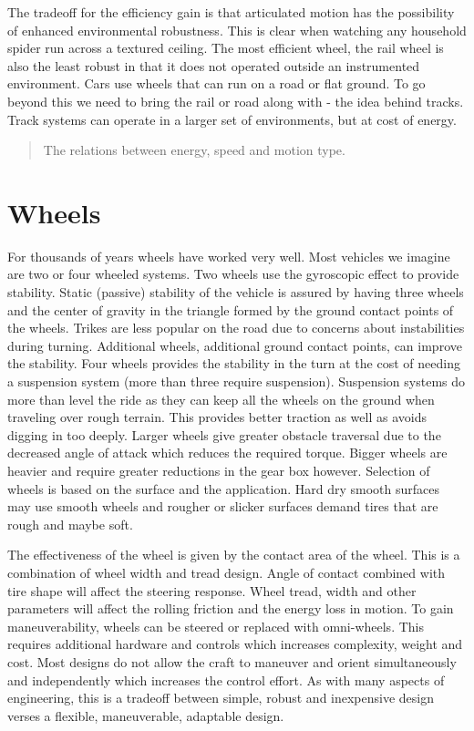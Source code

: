 The tradeoff for the efficiency gain is that articulated motion has the
possibility of enhanced environmental robustness. This is clear when
watching any household spider run across a textured ceiling. The most
efficient wheel, the rail wheel is also the least robust in that it does
not operated outside an instrumented environment. Cars use wheels that
can run on a road or flat ground. To go beyond this we need to bring the
rail or road along with - the idea behind tracks. Track systems can
operate in a larger set of environments, but at cost of energy.

\begin{quote}
The relations between energy, speed and motion type.
\end{quote}

\hypertarget{wheels}{%
\section{Wheels}\label{wheels}}

For thousands of years wheels have worked very well. Most vehicles we
imagine are two or four wheeled systems. Two wheels use the gyroscopic
effect to provide stability. Static (passive) stability of the vehicle
is assured by having three wheels and the center of gravity in the
triangle formed by the ground contact points of the wheels. Trikes are
less popular on the road due to concerns about instabilities during
turning. Additional wheels, additional ground contact points, can
improve the stability. Four wheels provides the stability in the turn at
the cost of needing a suspension system (more than three require
suspension). Suspension systems do more than level the ride as they can
keep all the wheels on the ground when traveling over rough terrain.
This provides better traction as well as avoids digging in too deeply.
Larger wheels give greater obstacle traversal due to the decreased angle
of attack which reduces the required torque. Bigger wheels are heavier
and require greater reductions in the gear box however. Selection of
wheels is based on the surface and the application. Hard dry smooth
surfaces may use smooth wheels and rougher or slicker surfaces demand
tires that are rough and maybe soft.

The effectiveness of the wheel is given by the contact area of the
wheel. This is a combination of wheel width and tread design. Angle of
contact combined with tire shape will affect the steering response.
Wheel tread, width and other parameters will affect the rolling friction
and the energy loss in motion. To gain maneuverability, wheels can be
steered or replaced with omni-wheels. This requires additional hardware
and controls which increases complexity, weight and cost. Most designs
do not allow the craft to maneuver and orient simultaneously and
independently which increases the control effort. As with many aspects
of engineering, this is a tradeoff between simple, robust and
inexpensive design verses a flexible, maneuverable, adaptable design.

